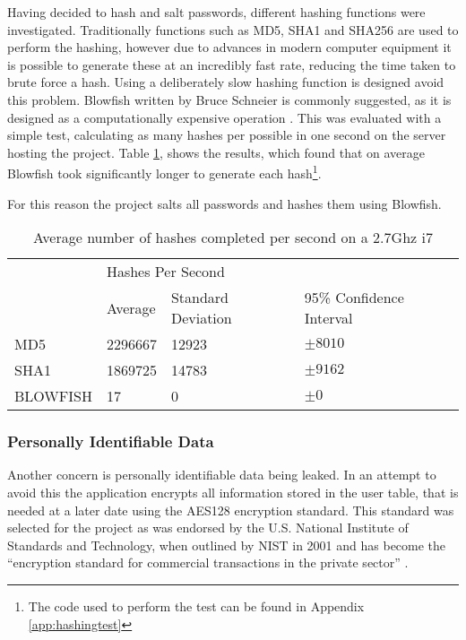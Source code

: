 Having decided to hash and salt passwords, different hashing functions were investigated. Traditionally functions such as MD5, SHA1 and SHA256 are used to perform the hashing, however due to advances in modern computer equipment it is possible to generate these at an incredibly fast rate, reducing the time taken to brute force a hash.
%
Using a deliberately slow hashing function is designed avoid this problem. Blowfish written by Bruce Schneier is commonly suggested, as it is designed as a computationally expensive operation \parencite{schneier1994description} . This was evaluated with a simple test, calculating as many hashes per possible in one second on the server hosting the project. Table \ref{tab:hashspeed}, shows the results, which found that on average Blowfish took significantly longer to generate each hash\footnote{The code used to perform the test can be found in Appendix \ref{app:hashingtest}}.

For this reason the project salts all passwords and hashes them using Blowfish.

\begin{table}[h]
\begin{tabular}{llll}
         & \multicolumn{3}{l}{Hashes Per Second}                   \\
         & Average & Standard Deviation & 95\% Confidence Interval \\
MD5      & \num{2296667} & \num{12923}  & $\pm 8010$   \\
SHA1     & \num{1869725} & \num{14783}  & $\pm 9162$    \\
BLOWFISH & 17            & 0            & $\pm 0$                 \\
\end{tabular}
\label{tab:hashspeed}
\caption{Average number of hashes completed per second on a 2.7Ghz i7}
\end{table}

\subsubsection{Personally Identifiable Data}
Another concern is personally identifiable data being leaked. In an attempt to avoid this the application encrypts all information stored in the user table, that is needed at a later date using the AES128 encryption standard. This standard was selected for the project as was endorsed by the U.S. National Institute of Standards and Technology, when outlined by NIST in 2001 and has become the ``encryption standard for commercial transactions in the private sector'' \cite{nist2010aes, stair2009informationsystems}.

